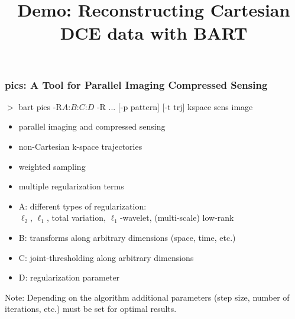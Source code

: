 \documentclass{beamer}
\title{\large Demo: Reconstructing Cartesian DCE data with BART}
\begin{document}
\frame{\titlepage}








\begin{frame}
\frametitle{pics: A Tool for Parallel Imaging Compressed Sensing}

$>$ bart pics {\color{violet}-R}{\color{yellow}$A$}:{\color{blue}$B$}:{\color{cyan}$C$}:{\color{pink}$D$}
{\color{violet}-R} ... {\color{red}[-p pattern]} {\color{red}[-t trj]} kspace {\color{green}sens} image

\vspace{0.5cm}
\begin{itemize}
\item {\color{green}parallel imaging} and compressed sensing
\item {\color{red}non-Cartesian k-space trajectories}
\item {\color{red}weighted sampling}
\item {\color{violet}multiple regularization terms}
\item {\color{yellow}A:} different {\color{yellow}types of regularization}: \\
		$\ell_2$, $\ell_1$, total variation,  $\ell_1$-wavelet, (multi-scale) low-rank
\item {\color{blue}B: transforms} along {\color{blue}arbitrary dimensions} (space, time, etc.)
\item {\color{cyan}C: joint-thresholding} along arbitrary dimensions
\item {\color{pink}D: regularization parameter}
\end{itemize}

\vfill
{\small
Note: Depending on the algorithm additional parameters (step size, number of iterations, etc.)
must be set for optimal results.}

\end{frame}
\end{document}
